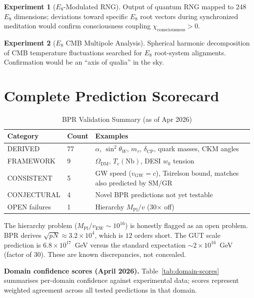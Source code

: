 \documentclass[12pt,oneside]{book}
\theoremstyle{definition}
\newtheorem{experiment}{Experiment}[chapter]
\newcommand{\EEight}{E_8}
\begin{document}
\begin{experiment}[$E_8$-Modulated RNG]
  Output of quantum RNG mapped to 248 $\EEight$ dimensions; deviations toward
  specific $\EEight$ root vectors during synchronized meditation would confirm
  consciousness coupling $\chi_{\mathrm{consciousness}} > 0$.
\end{experiment}

\begin{experiment}[$E_8$ CMB Multipole Analysis]
  Spherical harmonic decomposition of CMB temperature fluctuations searched for
  $\EEight$ root-system alignments. Confirmation would be an ``axis of qualia''
  in the sky.
\end{experiment}

\section{Complete Prediction Scorecard}

\begin{longtable}{@{}lll@{}}
  \caption{BPR Validation Summary (as of Apr 2026)}\\
  \toprule\textbf{Category} & \textbf{Count} & \textbf{Examples}\\
  \midrule\endfirsthead\midrule\endhead
  DERIVED & 77 & $\alpha$, $\sin^2\theta_W$, $m_\tau$, $\delta_{\mathrm{CP}}$, quark masses, CKM angles\\
  FRAMEWORK & 9 & $\Omega_{\mathrm{DM}}$, $T_c(\mathrm{Nb})$, DESI $w_0$ tension\\
  CONSISTENT & 5 & GW speed ($v_{\mathrm{GW}}=c$), Tsirelson bound, matches also predicted by SM/GR\\
  CONJECTURAL & 4 & Novel BPR predictions not yet testable\\
  OPEN failures & 1 & Hierarchy $M_{\mathrm{Pl}}/v$ (30$\times$ off)\\
  \bottomrule
\end{longtable}

The hierarchy problem ($M_{\mathrm{Pl}}/v_{\mathrm{EW}} \sim 10^{16}$) is
honestly flagged as an open problem. BPR derives $\sqrt{pN} \approx 3.2\times 10^4$,
which is $12$ orders short. The GUT scale prediction is $6.8\times10^{17}$~GeV
versus the standard expectation $\sim 2\times10^{16}$~GeV (factor of $30$). These
are known discrepancies, not concealed.

\medskip\noindent\textbf{Domain confidence scores (April 2026).}
Table~\ref{tab:domain-scores} summarises per-domain confidence against experimental
data; scores represent weighted agreement across all tested predictions in that domain.
\end{document}
